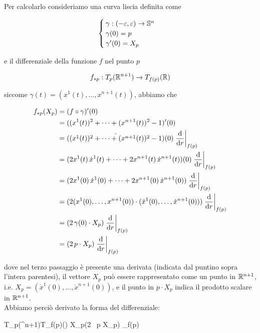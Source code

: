 Per calcolarlo consideriamo una curva liscia definita come

\begin{equation}
	\begin{cases}
		\gamma : (-\varepsilon,\varepsilon) \to \S^{n}\\
		\gamma(0) = p\\
		\gamma'(0) = X_{p}
	\end{cases}
\end{equation}

e il differenziale della funzione $ f $ nel punto $ p $

\begin{equation}
	f_{*p} : T_{p}(\R^{n+1}) \to T_{f(p)}(\R)
\end{equation}

siccome $ \gamma(t) = (x^{1}(t),\dots,x^{n+1}(t)) $, abbiamo che

\begin{align}
	\begin{split}
		f_{*p}(X_{p}) &= (f \circ \gamma)'(0)\\
		&= ((x^{1}(t))^{2} + \cdots + (x^{n+1}(t))^{2} - 1)'(0)\\
		&= \dot{((x^{1}(t))^{2} + \cdots + (x^{n+1}(t))^{2} - 1)}(0) \eval{ \dv{r} }_{f(p)}\\
		&= (2 x^{1}(t) \, \dot{x}^{1}(t) + \cdots + 2 x^{n+1}(t) \, \dot{x}^{n+1}(t))(0) \eval{ \dv{r} }_{f(p)}\\
		&= (2 x^{1}(0) \, \dot{x}^{1}(0) + \cdots + 2 x^{n+1}(0) \, \dot{x}^{n+1}(0)) \eval{ \dv{r} }_{f(p)}\\
		&= (2 (x^{1}(0), \dots, x^{n+1}(0)) \cdot (\dot{x}^{1}(0), \dots, \dot{x}^{n+1}(0))) \eval{ \dv{r} }_{f(p)}\\
		&= (2 \, \gamma(0) \cdot X_{p}) \eval{ \dv{r} }_{f(p)}\\
		&= (2 \, p \cdot X_{p}) \eval{ \dv{r} }_{f(p)}
	\end{split}
\end{align}

dove nel terzo passaggio è presente una derivata (indicata dal puntino sopra l'intera parentesi), il vettore $ X_{p} $ può essere rappresentato come un punto in $ \R^{n+1} $, i.e. $ X_{p} = (\dot{x}^{1}(0),\dots,\dot{x}^{n+1}(0)) $, e il punto in $ p \cdot X_{p} $ indica il prodotto scalare in $ \R^{n+1} $.\\
Abbiamo perciò derivato la forma del differenziale:

	{T_{p}(\R^{n+1})}{T_{f(p)}(\R)}
	{X_{p}}{(2 \, p \cdot X_{p}) _{f(p)}}
	

